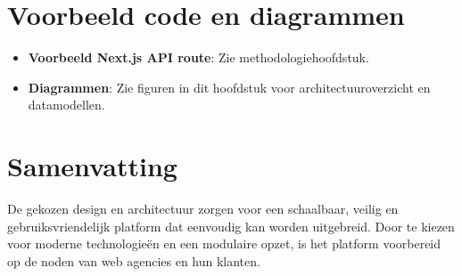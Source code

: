 \section{Voorbeeld code en diagrammen}
\label{sec:code-diagrammen}

\begin{itemize}
    \item \textbf{Voorbeeld Next.js API route}: Zie methodologiehoofdstuk.
    \item \textbf{Diagrammen}: Zie figuren in dit hoofdstuk voor architectuuroverzicht en datamodellen.
\end{itemize}

\section{Samenvatting}
\label{sec:samenvatting}

De gekozen design en architectuur zorgen voor een schaalbaar, veilig en gebruiksvriendelijk platform dat eenvoudig kan worden uitgebreid. Door te kiezen voor moderne technologieën en een modulaire opzet, is het platform voorbereid op de noden van web agencies en hun klanten.


